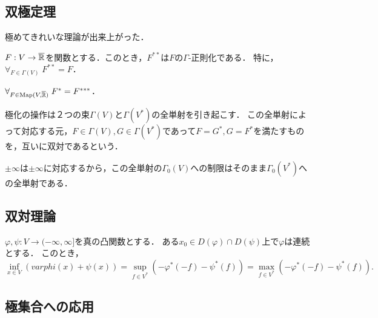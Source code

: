\documentclass[uplatex,dvipdfmx]{jsreport}
\begin{document}
\subsection{双極定理}

\begin{tcolorbox}[colframe=ForestGreen, colback=ForestGreen!10!white,breakable,colbacktitle=ForestGreen!40!white,coltitle=black,fonttitle=\bfseries\sffamily,
title=]
    極めてきれいな理論が出来上がった．
\end{tcolorbox}

\begin{proposition}
    $F:V\to\overline{\mathbb{R}}$を関数とする．このとき，$F^{**}$は$F$の$\Gamma$-正則化である．
    特に，$\forall_{F\in\Gamma(V)}\;F^{**}=F$．
\end{proposition}

\begin{corollary}
    $\forall_{F\in\mathrm{Map}(V,\overline{\mathbb{R}})}\;F^*=F^{***}$．
\end{corollary}

\begin{definition}[duality]
    極化の操作は２つの束$\Gamma(V)$と$\Gamma(V^*)$の全単射を引き起こす．
    この全単射によって対応する元，$F\in\Gamma(V),G\in\Gamma(V^*)$であって$F=G^*,G=F^*$を満たすものを，互いに双対であるという．
\end{definition}
\begin{remark}
    $\pm\infty$は$\pm\infty$に対応するから，この全単射の$\Gamma_0(V)$への制限はそのまま$\Gamma_0(V^*)$への全単射である．
\end{remark}

\subsection{双対理論}

\begin{theorem}\label{thm-Fenchel-Rockafellar}
    $\varphi,\psi:V\to(-\infty,\infty]$を真の凸関数とする．
    ある$x_0\in D(\varphi)\cap D(\psi)$上で$\varphi$は連続とする．
    このとき，
    \[\inf_{x\in V}(varphi(x)+\psi(x))=\sup_{f\in V^*}(-\varphi^*(-f)-\psi^*(f))=\max_{f\in V^*}(-\varphi^*(-f)-\psi^*(f)).\]
\end{theorem}

\subsection{極集合への応用}
\end{document}
